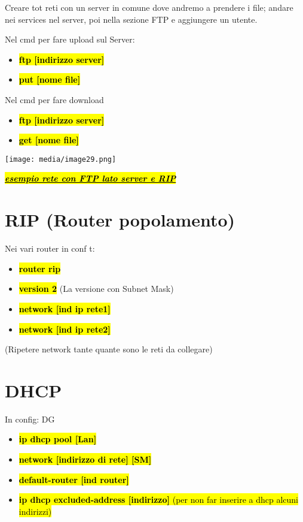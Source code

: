Creare tot reti con un server in comune dove andremo a prendere i file;
andare nei services nel server, poi nella sezione FTP e aggiungere un
utente.

Nel cmd per fare upload sul Server:

\begin{itemize}
\item
  \textbf{\hl{ftp {[}indirizzo server{]}}}
\item
  \textbf{\hl{put {[}nome file{]}}}
\end{itemize}

Nel cmd per fare download

\begin{itemize}
\item
  \textbf{\hl{ftp {[}indirizzo server{]}}}
\item
  \textbf{\hl{get {[}nome file{]}}}
\end{itemize}

\texttt{[image: media/image29.png]}

\emph{\textbf{\hl{\ul{esempio rete con FTP lato server e RIP}}}}

\section{RIP (Router popolamento)}\label{rip-router-popolamento}

Nei vari router in conf t:

\begin{itemize}
\item
  \textbf{\hl{router rip}}
\item
  \textbf{\hl{version 2}} (La versione con Subnet Mask)
\item
  \textbf{\hl{network {[}ind ip rete1{]}}}
\item
  \textbf{\hl{network {[}ind ip rete2{]}}}
\end{itemize}

(Ripetere network tante quante sono le reti da collegare)

\section{\texorpdfstring{\textbf{DHCP}}{DHCP}}\label{dhcp}

In config: DG

\begin{itemize}
\item
  \textbf{\hl{ip dhcp pool {[}Lan{]}}}
\item
  \textbf{\hl{network {[}indirizzo di rete{]} {[}SM{]}}}
\item
  \textbf{\hl{default-router {[}ind router{]}}}
\item
  \hl{\textbf{ip dhcp excluded-address {[}indirizzo{]}} (per non far
  inserire a dhcp alcuni indirizzi)}
\end{itemize}

